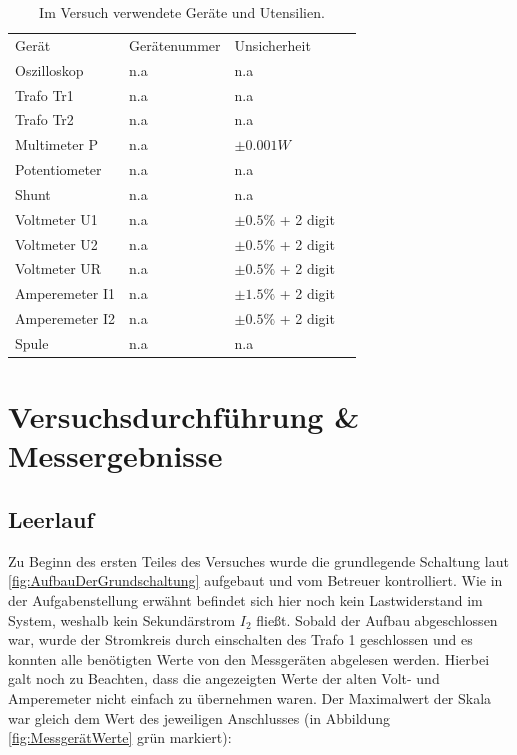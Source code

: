 \documentclass[12pt,a4paper,twoside]{article}
\begin{document}
    \begin{table}[H]
        \centering
        \caption{Im Versuch verwendete Geräte und Utensilien.}
        \label{tab:geraete}
        \begin{tabular}{| l | l | l | l |}
            \hline
            Gerät & Gerätenummer  & Unsicherheit \\
            Oszilloskop & {n.a} & {n.a} \\
            Trafo Tr1 & {n.a} & {n.a} \\
            Trafo Tr2 & {n.a} & {n.a} \\
            Multimeter P & {n.a} & $\pm 0.001 W$ \\
            Potentiometer & {n.a} & {n.a} \\
            Shunt & {n.a} & {n.a} \\
            Voltmeter U1 & {n.a} & $\pm 0.5\%$ + 2 digit \\
            Voltmeter U2 & {n.a} & $\pm 0.5\%$ + 2 digit \\
            Voltmeter UR & {n.a} & $\pm 0.5\%$ + 2 digit \\
            Amperemeter I1 & {n.a} & $\pm 1.5\%$ + 2 digit \\
            Amperemeter I2 & {n.a} & $\pm 0.5\%$ + 2 digit \\
            Spule & {n.a} & {n.a} \\
            \hline
        \end{tabular}
    \end{table}


\section{Versuchsdurchführung \& Messergebnisse} %

\subsection{Leerlauf}

Zu Beginn des ersten Teiles des Versuches wurde die grundlegende Schaltung laut \ref{fig:AufbauDerGrundschaltung} aufgebaut und vom Betreuer kontrolliert.
Wie in der Aufgabenstellung erwähnt befindet sich hier noch kein Lastwiderstand im System, weshalb kein Sekundärstrom $I_{2}$ fließt. Sobald der Aufbau abgeschlossen war, wurde der Stromkreis durch einschalten des Trafo 1 geschlossen und es konnten alle benötigten Werte von den Messgeräten abgelesen werden.
Hierbei galt noch zu Beachten, dass die angezeigten Werte der alten Volt- und Amperemeter nicht einfach zu übernehmen waren. Der Maximalwert der Skala war gleich dem Wert des jeweiligen Anschlusses (in Abbildung \ref{fig:MessgerätWerte} grün markiert):
\end{document}
